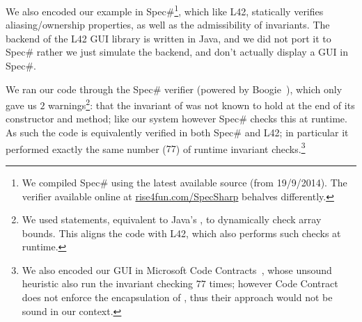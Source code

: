 

We also encoded our example in Spec\#\footnote{We compiled Spec\# using the latest available source (from 19/9/2014). The verifier available online at \url{rise4fun.com/SpecSharp} behalves differently.}, which like L42, statically verifies aliasing/ownership properties, as well as the admissibility of invariants.
The backend of the L42 GUI library is written in Java, and we did not port it to Spec\# rather we just simulate the backend, and don't actually display a GUI in Spec\#.

We ran our code through the Spec\# verifier (powered by Boogie~\cite{DBLP:conf/fmco/BarnettCDJL05}), which only gave us $2$ warnings\footnote{We used \Q@assume@ statements, equivalent to Java's \Q@assert@, to dynamically check array bounds. %
This aligns the code with L42, which also performs such checks at runtime.}: that the invariant of \Q@SafeMovable@ was not known to hold at the end of its constructor and \Q@dispatch@ method; like our system however Spec\# checks this at runtime. As such the code is equivalently verified in both Spec\# and L42; in particular it performed exactly the same number ($77$) of runtime invariant checks.\footnote{%
We also encoded our GUI in Microsoft Code Contracts~\cite{DBLP:conf/sac/FahndrichBL10}, whose unsound heuristic also run the invariant checking $77$ times; however Code Contract does not enforce the
encapsulation of \Q@children@, thus their approach would not be sound in our context.}

